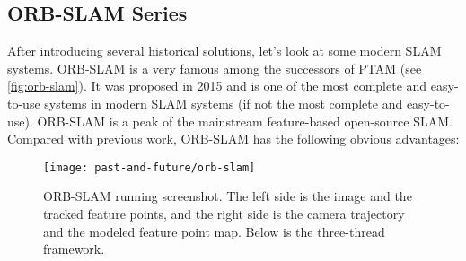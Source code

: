 \subsection{ORB-SLAM Series} 
After introducing several historical solutions, let's look at some modern SLAM systems. ORB-SLAM is a very famous \textsuperscript{\cite{Mur-Artal2015}} among the successors of PTAM (see \autoref{fig:orb-slam}). It was proposed in 2015 and is one of the most complete and easy-to-use systems in modern SLAM systems (if not the most complete and easy-to-use). ORB-SLAM is a peak of the mainstream feature-based open-source SLAM. Compared with previous work, ORB-SLAM has the following obvious advantages:

\begin{figure}[!ht]
	\centering
	\texttt{[image: past-and-future/orb-slam]}
	\caption{ORB-SLAM running screenshot. The left side is the image and the tracked feature points, and the right side is the camera trajectory and the modeled feature point map. Below is the three-thread framework.}
	\label{fig:orb-slam}
\end{figure}

